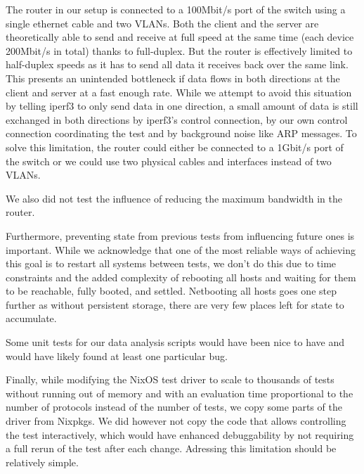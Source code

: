 The router in our setup is connected to a 100Mbit/s port of the switch using a single ethernet cable and two VLANs.
Both the client and the server are theoretically able to send and receive at full speed at the same time (each device 200Mbit/s in total) thanks to full-duplex.
But the router is effectively limited to half-duplex speeds as it has to send all data it receives back over the same link.
This presents an unintended bottleneck if data flows in both directions at the client and server at a fast enough rate.
While we attempt to avoid this situation by telling iperf3 to only send data in one direction, a small amount of data is still exchanged in both directions by iperf3's control connection, by our own control connection coordinating the test and by background noise like ARP messages.
To solve this limitation, the router could either be connected to a 1Gbit/s port of the switch or we could use two physical cables and interfaces instead of two VLANs.

We also did not test the influence of reducing the maximum bandwidth in the router.

Furthermore, preventing state from previous tests from influencing future ones is important.
While we acknowledge that one of the most reliable ways of achieving this goal is to restart all systems between tests, we don't do this due to time constraints and the added complexity of rebooting all hosts and waiting for them to be reachable, fully booted, and settled.
Netbooting all hosts goes one step further as without persistent storage, there are very few places left for state to accumulate.

Some unit tests for our data analysis scripts would have been nice to have and would have likely found at least one particular bug.

Finally, while modifying the NixOS test driver to scale to thousands of tests without running out of memory and with an evaluation time proportional to the number of protocols instead of the number of tests, we copy some parts of the driver from Nixpkgs.
We did however not copy the code that allows controlling the test interactively, which would have enhanced debuggability by not requiring a full rerun of the test after each change.
Adressing this limitation should be relatively simple.


